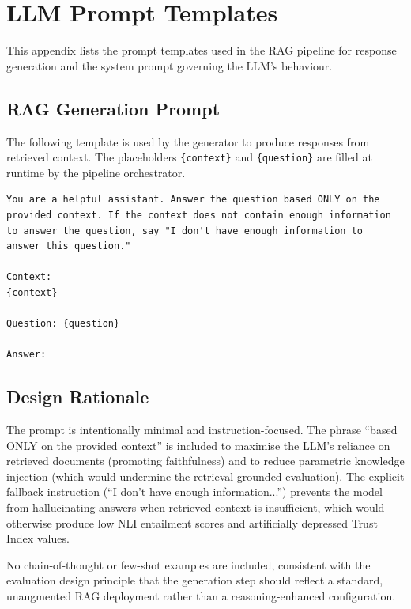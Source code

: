 \chapter{LLM Prompt Templates}
\label{app:prompts}

This appendix lists the prompt templates used in the RAG pipeline for response generation and the system prompt governing the LLM's behaviour.

\section{RAG Generation Prompt}

The following template is used by the generator to produce responses from retrieved context. The placeholders \texttt{\{context\}} and \texttt{\{question\}} are filled at runtime by the pipeline orchestrator.

\begin{verbatim}
You are a helpful assistant. Answer the question based ONLY on the
provided context. If the context does not contain enough information
to answer the question, say "I don't have enough information to
answer this question."

Context:
{context}

Question: {question}

Answer:
\end{verbatim}

\section{Design Rationale}

The prompt is intentionally minimal and instruction-focused. The phrase ``based ONLY on the provided context'' is included to maximise the LLM's reliance on retrieved documents (promoting faithfulness) and to reduce parametric knowledge injection (which would undermine the retrieval-grounded evaluation). The explicit fallback instruction (``I don't have enough information...'') prevents the model from hallucinating answers when retrieved context is insufficient, which would otherwise produce low NLI entailment scores and artificially depressed Trust Index values.

No chain-of-thought or few-shot examples are included, consistent with the evaluation design principle that the generation step should reflect a standard, unaugmented RAG deployment rather than a reasoning-enhanced configuration.

